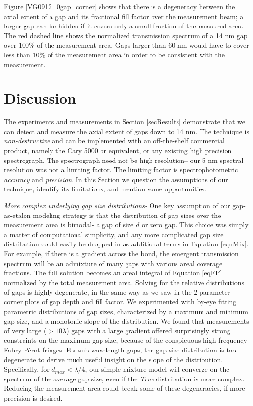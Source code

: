 \documentclass[osajnl,preprint,showpacs,superscriptaddress,12pt]{revtex4-1} %
\begin{document}
Figure \ref{VG0912_0gap_corner} shows that there is a degeneracy between the axial extent of a gap and its fractional fill factor over the measurement beam; a larger gap can be hidden if it covers only a small fraction of the measured area.  The red dashed line shows the normalized transmission spectrum of a 14 nm gap over 100\% of the measurement area.  Gaps larger than 60 nm would have to cover less than 10\% of the measurement area in order to be consistent with the measurement.


\section{Discussion}

The experiments and measurements in Section \ref{secResults} demonstrate that we can detect and measure the axial extent of gaps down to 14 nm.  The technique is \emph{non-destructive} and can be implemented with an off-the-shelf commercial product, namely the Cary 5000 or equivalent, or any existing high precision spectrograph.  The spectrograph need not be high resolution-- our 5 nm spectral resolution was not a limiting factor.  The limiting factor is spectrophotometric \emph{accuracy} and \emph{precision}.  In this Section we question the assumptions of our technique, identify its limitations, and mention some opportunities.

\emph{More complex underlying gap size distributions-} One key assumption of our gap-as-etalon modeling strategy is that the distribution of gap sizes over the measurement area is bimodal- a gap of size $d$ or zero gap.  This choice was simply a matter of computational simplicity, and any more complicated gap size distribution could easily be dropped in as additional terms in Equation \ref{eqnMix}.  For example, if there is a gradient across the bond, the emergent transmission spectrum will be an admixture of many gaps with various areal coverage fractions.  The full solution becomes an areal integral of Equation \ref{eqFP} normalized by the total measurement area.  Solving for the relative distributions of gaps is highly degenerate, in the same way as we saw in the 2-parameter corner plots of gap depth and fill factor.  We experimented with by-eye fitting parametric distributions of gap sizes, characterized by a maximum and minimum gap size, and a monotonic slope of the distribution.  We found that measurements of very large ($>10\lambda$) gaps with a large gradient offered surprisingly strong constraints on the maximum gap size, because of the conspicuous high frequency Fabry-P\`erot fringes.  For sub-wavelength gaps, the gap size distribution is too degenerate to derive much useful insight on the slope of the distribution.  Specifically, for $d_{max}<\lambda/4$, our simple mixture model will converge on the spectrum of the average gap size, even if the \emph{True} distribution is more complex.  Reducing the measurement area could break some of these degeneracies, if more precision is desired.
\end{document}
